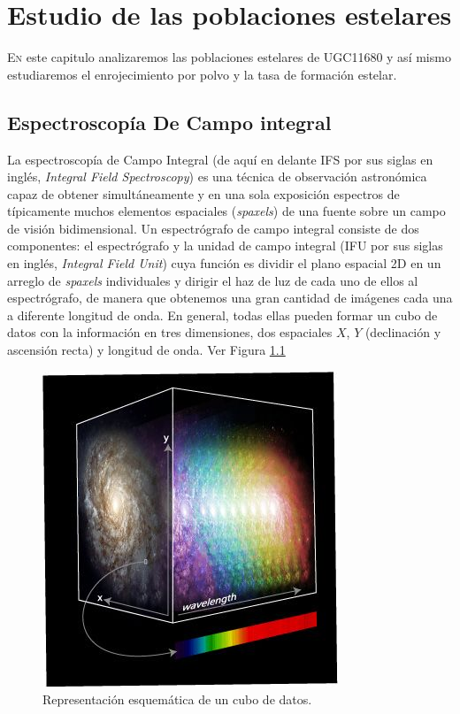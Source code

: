 

\chapter{Estudio de las poblaciones estelares}

\lettrine[lines=1]{E}n este capitulo analizaremos las poblaciones estelares de UGC11680 y así mismo estudiaremos el enrojecimiento por polvo y la tasa de formación estelar.

\section{Espectroscopía De Campo integral}

La espectroscopía de Campo Integral (de aquí en delante IFS por sus siglas en
inglés, \textit{Integral Field Spectroscopy}) es una técnica de observación astronómica capaz de obtener simultáneamente y en una sola
exposición espectros de típicamente muchos elementos espaciales (\textit{spaxels}) de una fuente sobre un campo de visión bidimensional.
Un espectrógrafo de campo integral consiste de dos componentes: el espectrógrafo y la unidad de campo integral (IFU por sus siglas en inglés, \textit{Integral Field Unit}) cuya función es dividir el plano espacial 2D en un arreglo de \textit{spaxels}
individuales y dirigir el haz de luz de cada uno de ellos al espectrógrafo, de manera que obtenemos una gran cantidad de imágenes
cada una a diferente longitud de onda. En general, todas ellas pueden formar un cubo de datos con la información
en tres dimensiones, dos espaciales $X$, $Y$ (declinación y ascensión recta) y longitud de onda. Ver Figura \ref{cubo}


\begin{figure}
  \centering
    \includegraphics[scale=0.5]{data-cube-illustration.jpg}
  \caption[Cubo de Datos]{Representación esquemática de un cubo de datos.}
  \label{cubo}
\end{figure}

